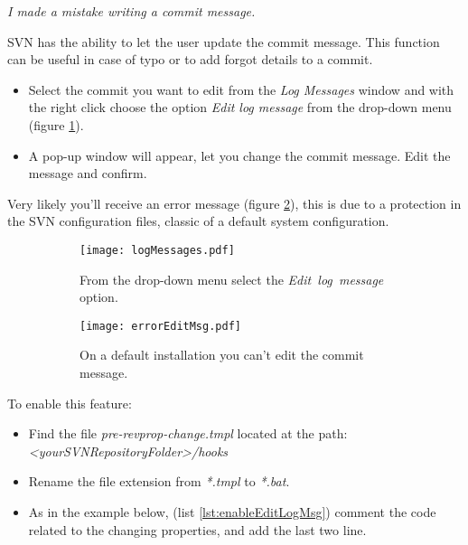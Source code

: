 \textit{I made a mistake writing a commit message.} \newline


SVN has the ability to let the user update the commit message. This function can be useful in case of typo or to add forgot details to a commit.\newline

\begin{itemize}

    \item Select the commit you want to edit from the \textit{Log Messages} window and with the right click choose the option \textit{Edit log message} from the drop-down menu (figure \ref{fig:logMessages}).
    
    \item A pop-up window will appear, let you change the commit message. Edit the message and confirm.
    
\end{itemize}

Very likely you'll receive an error message (figure \ref{fig:errorEditMsg}), this is due to a protection in the SVN configuration files, classic of a default system configuration.





\begin{figure}[htbp]
\begin{subfigure}{0.5\textwidth}
  \centering
  \texttt{[image: logMessages.pdf]}
  \caption{From the drop-down menu select the \hbox{\textit{Edit log message}} option.}
  \label{fig:logMessages}
\end{subfigure}%
\hspace{5mm}
\begin{subfigure}{0.5\textwidth}
  \centering
  \texttt{[image: errorEditMsg.pdf]}
  \caption{On a default installation you can't edit the commit message.}
  \label{fig:errorEditMsg}
\end{subfigure}
\caption{}
\label{fig:svnEditLogMsg}
\end{figure}


\newpage

To enable this feature:

\begin{itemize}

    \item Find the file \textit{pre-revprop-change.tmpl} located at the path: \textit{<yourSVNRepositoryFolder>/hooks}
    
    \item Rename the file extension from \textit{*.tmpl} to \textit{*.bat}.
    
    \item As in the example below, (list \ref{lst:enableEditLogMsg}) comment the code related to the changing properties, and add the last two line.
    
\end{itemize}


